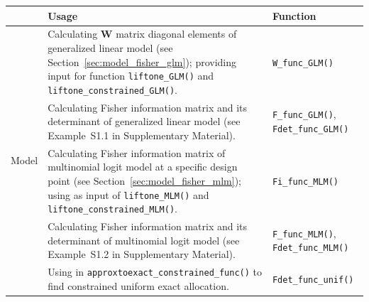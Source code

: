 \begin{table}[htb!]
  \scriptsize
  \begin{tabularx}{\textwidth}{c|b|m}
    \toprule
    & Usage                                             & Function   \\ \hline
    \multirow[c]{8}{*}{Model}  & Calculating $\mathbf W$ matrix diagonal elements of generalized linear model (see Section~\ref{sec:model_fisher_glm}); providing input for function \texttt{liftone\_GLM()} and \texttt{liftone\_constrained\_GLM()}. & \texttt{W\_func\_GLM()} \\
    &  Calculating Fisher information matrix and its determinant of generalized linear model (see Example~S1.1 in Supplementary Material). & \texttt{F\_func\_GLM()}, \texttt{Fdet\_func\_GLM()}\\
    & Calculating Fisher information matrix of multinomial logit model at a specific design point (see Section~\ref{sec:model_fisher_mlm}); using as input of \texttt{liftone\_MLM()} and \texttt{liftone\_constrained\_MLM()}. & \texttt{Fi\_func\_MLM()}\\
    & Calculating Fisher information matrix and its determinant of multinomial logit model (see Example~S1.2 in Supplementary Material). & \texttt{F\_func\_MLM()}, \texttt{Fdet\_func\_MLM()}\\
    & Using in \texttt{approxtoexact\_constrained\_func()} to find constrained uniform exact allocation.             & \texttt{Fdet\_func\_unif()}\\\hline


\end{tabularx}
\end{table}
